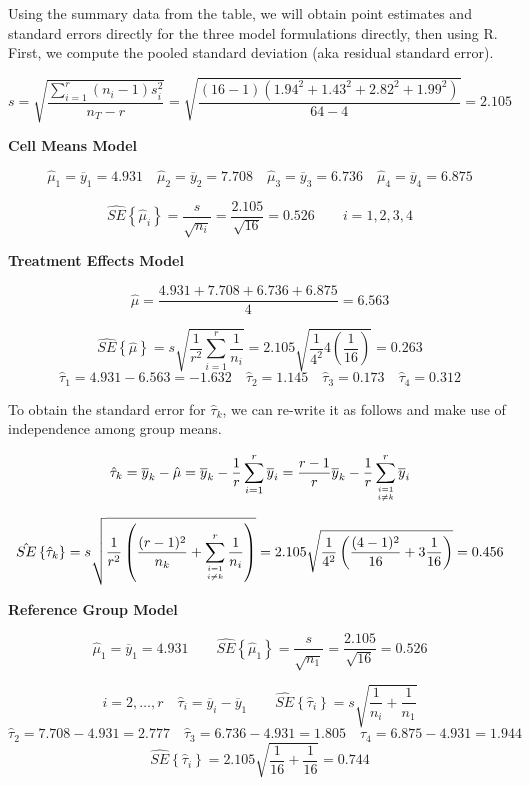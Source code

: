 \documentclass[
]{book}
\begin{document}
Using the summary data from the table, we will obtain point estimates
and standard errors directly for the three model formulations directly,
then using R. First, we compute the pooled standard deviation (aka
residual standard error).

\[
s=\sqrt{\frac{\sum_{i=1}^r\left(n_i-1\right)s_i^2}{n_T-r}} =
\sqrt{\frac{(16-1)\left(1.94^2+1.43^2+2.82^2+1.99^2\right)}{64-4}} = 2.105
\]

\textbf{Cell Means Model}

\[
\hat{\mu}_1=\overline{y}_1=4.931 \quad 
\hat{\mu}_2=\overline{y}_2=7.708 \quad 
\hat{\mu}_3=\overline{y}_3=6.736 \quad 
\hat{\mu}_4=\overline{y}_4=6.875 \]

\[
\hat{SE}\left\{\hat{\mu}_i\right\}=\frac{s}{\sqrt{n_i}}=\frac{2.105}{\sqrt{16}}=0.526
\qquad i=1,2,3,4
\]

\textbf{Treatment Effects Model}

\[
\hat{\mu}=\frac{4.931+7.708+6.736+6.875}{4}=6.563 \]

\[
\hat{SE}\left\{\hat{\mu}\right\}=s\sqrt{\frac{1}{r^2}\sum_{i=1}^r\frac{1}{n_i}} =
2.105\sqrt{\frac{1}{4^2}4\left(\frac{1}{16}\right)}=0.263
\] \[
\hat{\tau}_1=4.931-6.563=-1.632
\quad \hat{\tau}_2=1.145
\quad \hat{\tau}_3=0.173
\quad \hat{\tau}_4=0.312 \]

To obtain the standard error for \(\hat{\tau}_k\), we can re-write it as
follows and make use of independence among group means.

\[
\hat{\tau}_k = \overline{y}_k-\hat{\mu} =
\overline{y}_k - \frac{1}{r}\sum_{i=1}^r\overline{y}_i
=\frac{r-1}{r} \overline{y}_k - \frac{1}{r}\sum_{i=1 \atop i \not=k}^r\overline{y}_i
\]

\[
\hat{SE}\left\{\hat{\tau}_k\right\} =
s\sqrt{\frac{1}{r^2}\left(\frac{(r-1)^2}{n_k}+
\sum_{i=1 \atop i \not=k}^r\frac{1}{n_i}\right)} =
2.105\sqrt{\frac{1}{4^2}\left(\frac{(4-1)^2}{16}+3\frac{1}{16}\right)}
=0.456 
\]

\textbf{Reference Group Model}

\[
\hat{\mu}_1 = \overline{y}_1 = 4.931 \qquad \hat{SE}\left\{\hat{\mu}_1\right\}=
\frac{s}{\sqrt{n_1}}=\frac{2.105}{\sqrt{16}}=0.526
\]

\[
i=2,\ldots, r \quad \hat{\tau}_i = \overline{y}_i-\overline{y}_1
\qquad \hat{SE}\left\{\hat{\tau}_i\right\}=s \sqrt{\frac{1}{n_i}+\frac{1}{n_1}}
\] \[
\hat{\tau}_2=7.708-4.931=2.777 \quad
\hat{\tau}_3=6.736-4.931=1.805 \quad
\hat{\tau}_4=6.875-4.931=1.944
\] \[
\hat{SE}\left\{\hat{\tau}_i\right\}=2.105 \sqrt{\frac{1}{16}+\frac{1}{16}} =
0.744
\]
\end{document}
